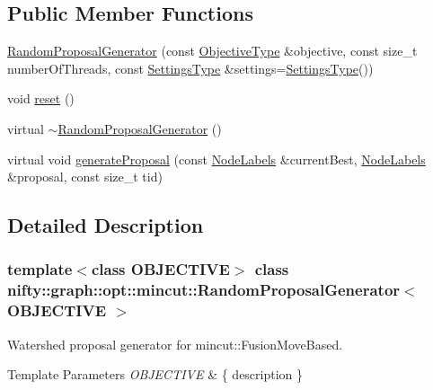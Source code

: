 \subsection*{Public Member Functions}
\begin{DoxyCompactItemize}
\item 
\hyperlink{classnifty_1_1graph_1_1opt_1_1mincut_1_1RandomProposalGenerator_a7d65ce3550ca45b366393b0011c8d400}{Random\+Proposal\+Generator} (const \hyperlink{classnifty_1_1graph_1_1opt_1_1mincut_1_1RandomProposalGenerator_af6ef802093e4de20535c753d90f85d89}{Objective\+Type} \&objective, const size\+\_\+t number\+Of\+Threads, const \hyperlink{structnifty_1_1graph_1_1opt_1_1mincut_1_1RandomProposalGenerator_1_1SettingsType}{Settings\+Type} \&settings=\hyperlink{structnifty_1_1graph_1_1opt_1_1mincut_1_1RandomProposalGenerator_1_1SettingsType}{Settings\+Type}())
\item 
void \hyperlink{classnifty_1_1graph_1_1opt_1_1mincut_1_1RandomProposalGenerator_ac2857db1b267f6419ae62b5c31b64dac}{reset} ()
\item 
virtual \hyperlink{classnifty_1_1graph_1_1opt_1_1mincut_1_1RandomProposalGenerator_a4faf57617ed7db6671a58b78f4b27cf8}{$\sim$\+Random\+Proposal\+Generator} ()
\item 
virtual void \hyperlink{classnifty_1_1graph_1_1opt_1_1mincut_1_1RandomProposalGenerator_ad7a71f08676a1e356b6480c85ad0ab53}{generate\+Proposal} (const \hyperlink{classnifty_1_1graph_1_1opt_1_1mincut_1_1ProposalGeneratorBase_a8e7bdb52139e951b4d4fc21c3cc6946a}{Node\+Labels} \&current\+Best, \hyperlink{classnifty_1_1graph_1_1opt_1_1mincut_1_1ProposalGeneratorBase_a8e7bdb52139e951b4d4fc21c3cc6946a}{Node\+Labels} \&proposal, const size\+\_\+t tid)
\end{DoxyCompactItemize}


\subsection{Detailed Description}
\subsubsection*{template$<$class O\+B\+J\+E\+C\+T\+I\+VE$>$\newline
class nifty\+::graph\+::opt\+::mincut\+::\+Random\+Proposal\+Generator$<$ O\+B\+J\+E\+C\+T\+I\+V\+E $>$}

Watershed proposal generator for mincut\+::\+Fusion\+Move\+Based. 


\begin{DoxyTemplParams}{Template Parameters}
{\em O\+B\+J\+E\+C\+T\+I\+VE} & \{ description \} \\
\hline
\end{DoxyTemplParams}


